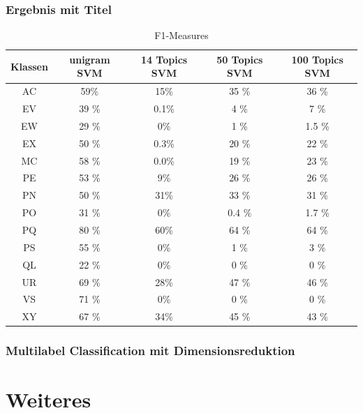 \documentclass[12pt, xcolor=table]{beamer}
\begin{document}
\begin{frame}
    \frametitle{Ergebnis mit Titel}
    \begin{center}
    \begin{table}
    \begin{tabular}{c|cccc}
        \tiny\textbf{Klassen} &\tiny \textbf{unigram SVM} &\tiny \textbf{14 Topics SVM} & \tiny \textbf{50 Topics SVM} & \tiny \textbf{100 Topics SVM}\\
        \hline
        \tiny AC &\tiny 59\% &\tiny 15\% &\tiny 35 \% &\tiny 36 \%\\
        \tiny EV &\tiny 39 \% &\tiny 0.1\% &\tiny 4 \% &\tiny 7 \%\\
        \tiny EW &\tiny 29 \% &\tiny 0\% &\tiny 1 \% &\tiny 1.5 \%\\
        \tiny EX &\tiny 50 \% &\tiny 0.3\% &\tiny 20 \% &\tiny 22 \%\\
        \tiny MC &\tiny 58 \% &\tiny 0.0\% &\tiny 19 \% &\tiny 23 \%\\
        \tiny PE &\tiny 53 \% &\tiny 9\% &\tiny 26 \% &\tiny 26 \%\\
        \tiny PN &\tiny 50 \% &\tiny 31\% &\tiny 33 \% &\tiny 31 \%\\
        \tiny PO &\tiny 31 \% &\tiny 0\% &\tiny 0.4 \% &\tiny 1.7 \%\\
        \tiny PQ &\tiny 80 \% &\tiny 60\% &\tiny 64 \% &\tiny 64 \%\\
        \tiny PS &\tiny 55 \% &\tiny 0\% &\tiny 1 \% &\tiny 3 \%\\
        \tiny QL &\tiny 22 \% &\tiny 0\% &\tiny 0 \% &\tiny 0 \%\\
        \tiny UR &\tiny 69 \% &\tiny 28\% &\tiny 47 \% &\tiny 46 \%\\
        \tiny VS &\tiny 71 \% &\tiny 0\% &\tiny 0 \% &\tiny 0 \%\\
        \tiny XY &\tiny 67 \% &\tiny 34\% &\tiny 45 \% &\tiny 43 \%\\
    \end{tabular}
     \caption*{F1-Measures}
    \end{table}
    \end{center}
\end{frame}

\begin{frame}
    \frametitle{Multilabel Classification mit Dimensionsreduktion}
\end{frame}

\section{Weiteres} %
\label{sec:Weiteres}
\end{document}
